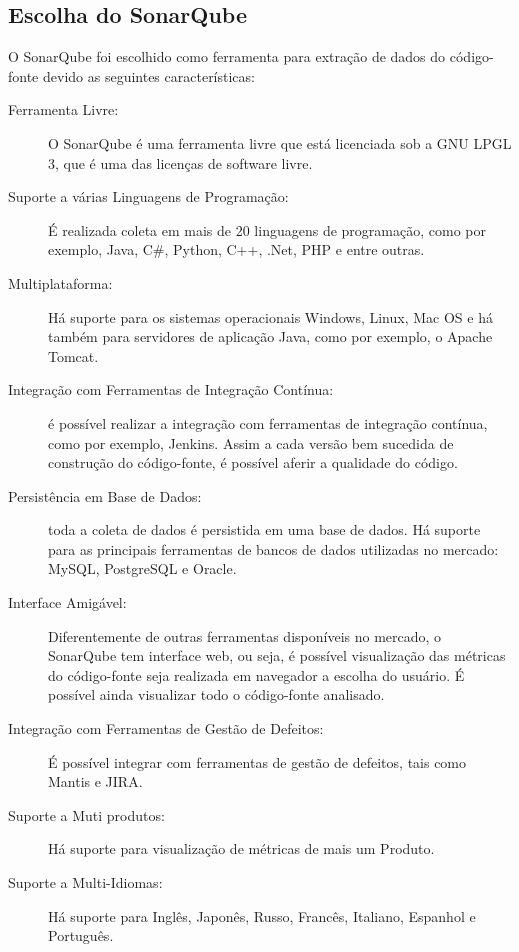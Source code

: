 \subsection{Escolha do SonarQube}
O SonarQube foi escolhido como ferramenta para extração de dados do código-fonte
 devido as seguintes características:
\begin{description}
  
\item [Ferramenta Livre:] O SonarQube é uma ferramenta livre que está 
licenciada sob a GNU LPGL 3, que é uma das licenças de software livre.

\item [Suporte a várias Linguagens de Programação:]  É realizada coleta em 
mais de 20 linguagens de programação, como por exemplo, Java, C\#, Python, 
C++, .Net, PHP e entre outras.

\item [Multiplataforma:] Há suporte para os sistemas operacionais Windows, 
Linux, Mac OS e há também para servidores de aplicação Java, como por exemplo,
o Apache Tomcat. 

\item [Integração com Ferramentas de Integração Contínua:] é possível realizar
a integração com ferramentas de integração contínua, como por exemplo, 
Jenkins. Assim a cada versão bem sucedida de construção do código-fonte, é 
possível aferir a qualidade do código.

\item [Persistência em Base de Dados:] toda a coleta de dados é persistida em 
uma base de dados. Há suporte para as principais ferramentas de bancos de 
dados utilizadas no mercado: MySQL, PostgreSQL e Oracle.

\item [Interface Amigável:] Diferentemente de outras ferramentas disponíveis 
no mercado, o SonarQube tem interface web, ou seja, é possível visualização 
das métricas do código-fonte seja realizada em navegador a escolha do usuário.
É possível ainda visualizar todo o código-fonte analisado.

\item [Integração com Ferramentas de Gestão de Defeitos:] É possível integrar 
com ferramentas de gestão de defeitos, tais como Mantis e JIRA.

\item [Suporte a Muti produtos:] Há suporte para visualização de métricas de 
 mais um Produto.

\item [Suporte a Multi-Idiomas:] Há suporte para Inglês, Japonês, Russo, 
Francês, Italiano, Espanhol e Português.


\end{description}
